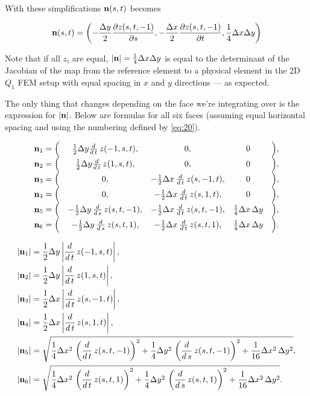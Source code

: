 \documentclass[11pt]{article}
\begin{document}
With these simplifications $\mathbf{n}(s,t)$ becomes

\begin{equation}
  \label{eq:34}
  \mathbf{n}(s,t) = \left(
    -\frac{\Delta y}{2}\frac{\partial z(s,t,-1)}{\partial s},
    -\frac{\Delta x}{2}\frac{\partial z(s,t,-1)}{\partial t},
    \frac{1}{4} \Delta x \Delta y
  \right)
\end{equation}

Note that if all $z_{i}$ are equal, $|\mathbf{n}| = \frac{1}{4} \Delta x \Delta y$ is
equal to the determinant of the Jacobian of the map from the reference
element to a physical element in the 2D $Q_{1}$ FEM setup with equal
spacing in $x$ and $y$ directions --- as expected.

The only thing that changes depending on the face we're integrating
over is the expression for $|\mathbf{n}|$. Below are formulas for all six
faces (assuming equal horizontal spacing and using the numbering
defined by \eqref{eq:20}).

\newcommand{\ddt}{\frac{d}{d\,t}}
\newcommand{\dds}{\frac{d}{d\,s}}
\begin{align*}
  \begin{array}{rcccl}
    \N_{1} = \Big( & \frac{1}{2}\dy\ddt\,z(-1 , s , t),& 0 ,& 0 & \Big) , \\
    \N_{2} = \Big( & \frac{1}{2}\dy\ddt\,z(1 , s , t),& 0 ,& 0 & \Big) , \\
    \N_{3} = \Big( & 0 ,& -\frac{1}{2}\dx\,\ddt\,z(s , -1 , t),& 0 & \Big) , \\
    \N_{4} = \Big( & 0 ,& -\frac{1}{2}\dx\,\ddt\,z(s , 1 , t),& 0 & \Big) , \\
    \N_{5} = \Big( & -\frac{1}{2}\dy\,\dds\,z(s , t , -1) ,& -\frac{1}{2}\dx\,\ddt\,z(s , t , -1) ,& \frac{1}{4}\dx\,\dy & \Big) , \\
    \N_{6} = \Big( & -\frac{1}{2}\dy\,\dds\,z(s , t , 1) ,& -\frac{1}{2}\dx\,\ddt\,z(s , t , 1) ,& \frac{1}{4}\dx\,\dy & \Big) . \\
  \end{array}
\end{align*}

\begin{align*}
  \left| \N_{1}\right|  & = \frac{1}{2}\dy\left| \ddt\,z(-1 , s , t)\right|, \\
  \left| \N_{2}\right|  & = \frac{1}{2}\dy\left| \ddt\,z(1 , s , t)\right|, \\
  \left| \N_{3}\right|  & = \frac{1}{2}\dx\left| \ddt\,z(s , -1 , t)\right|,\\
  \left| \N_{4}\right|  & = \frac{1}{2}\dx\left| \ddt\,z(s , 1 , t)\right|, \\
  \left| \N_{5}\right|  & = \sqrt{\frac{1}{4}\dx^2\,\left(\ddt\,z(s , t , -1)\right)^2+\frac{1}{4}\dy^2\,\left(\dds\,z(s , t , -1)\right)^2+\frac{1}{16}\dx^2\,\dy^2}, \\
  \left| \N_{6}\right|  & = \sqrt{\frac{1}{4}\dx^2\,\left(\ddt\,z(s , t , 1)\right)^2 +\frac{1}{4}\dy^2\,\left(\dds\,z(s , t , 1)\right)^2 +\frac{1}{16}\dx^2\,\dy^2}. \\
\end{align*}



\end{document}
